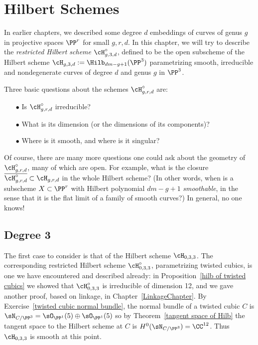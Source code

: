 

\chapter{Hilbert Schemes}
\label{HilbertSchemesChapter}

In earlier chapters, we described some  degree $d$ embeddings of curves of  genus $g$ in projective spaces $\PP^r$ for small $g,r,d$. In this chapter, we will try to describe the \emph{restricted Hilbert scheme} $\cH^\circ_{g,3,d}$, defined to be the open subscheme of the Hilbert scheme $\cH_{g,3,d} := \Hilb_{dm-g+1}(\PP^3)$ parametrizing smooth, irreducible and nondegenerate curves of degree $d$ and genus $g$ in $\PP^3$.

Three basic questions about the schemes $\cH^\circ_{g,r,d}$ are:

\begin{enumerate}
\item[$\bullet$] Is $\cH^\circ_{g,r,d}$ irreducible? 
\item[$\bullet$]  What is its dimension (or the dimensions of its components)?
\item[$\bullet$] Where is it smooth, and where is it singular?
\end{enumerate}

Of course, there are many more questions one could ask about the geometry of $\cH^\circ_{g,r,d}$, many of which are open. For example,  what is the closure $\overline{\cH^\circ_{g,r,d}} \subset \cH_{g,r,d}$ in the whole Hilbert scheme? (In other words, when is a subscheme $X \subset \PP^r$ with Hilbert polynomial $dm-g+1$ \emph{smoothable}, in the sense that it is the flat limit of a family of smooth curves?) In general, no one knows!


\section{Degree 3}\label{degree 3}

The first case to consider is that of the Hilbert scheme  $\cH_{0,3,3}$. The corresponding restricted Hilbert scheme $\cH^\circ_{0,3,3}$, parametrizing twisted cubics, is one we have encountered and described already: in Proposition~\ref{hilb of twisted cubics} we showed that $\cH^\circ_{0,3,3}$ is irreducible of dimension 12,
and we gave another proof, based on linkage, in Chapter~\ref{LinkageChapter}. 
By Exercise~\ref{twisted cubic normal bundle}, the normal bundle of a twisted cubic $C$ is $\sN_{C/\PP^3}=\sO_{\PP^1}(5)\oplus \sO_{\PP^1}(5)$
so by Theorem~\ref{tangent space of Hilb} the tangent space to the Hilbert scheme at $C$ is
$H^0(\sN_{C/\PP^3}) = \CC^{12}$. Thus $\cH_{0,3,3}$ is smooth at this point.

